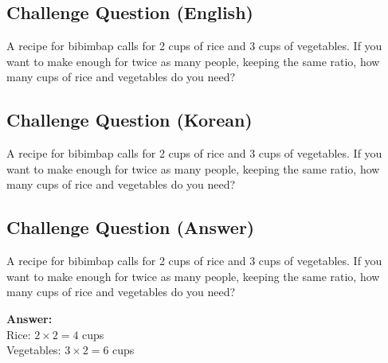 \cleardoublepage
\subsection*{Challenge Question (English)}
A recipe for bibimbap calls for 2 cups of rice and 3 cups of vegetables. If you want to make enough for twice as many people, keeping the same ratio, how many cups of rice and vegetables do you need?


\newpage
\subsection*{Challenge Question (Korean)}
A recipe for bibimbap calls for 2 cups of rice and 3 cups of vegetables. If you want to make enough for twice as many people, keeping the same ratio, how many cups of rice and vegetables do you need?


\newpage
\subsection*{Challenge Question (Answer)}
A recipe for bibimbap calls for 2 cups of rice and 3 cups of vegetables. If you want to make enough for twice as many people, keeping the same ratio, how many cups of rice and vegetables do you need?

\textbf{Answer:}\\
Rice: $2 \times 2 = 4$ cups\\
Vegetables: $3 \times 2 = 6$ cups

